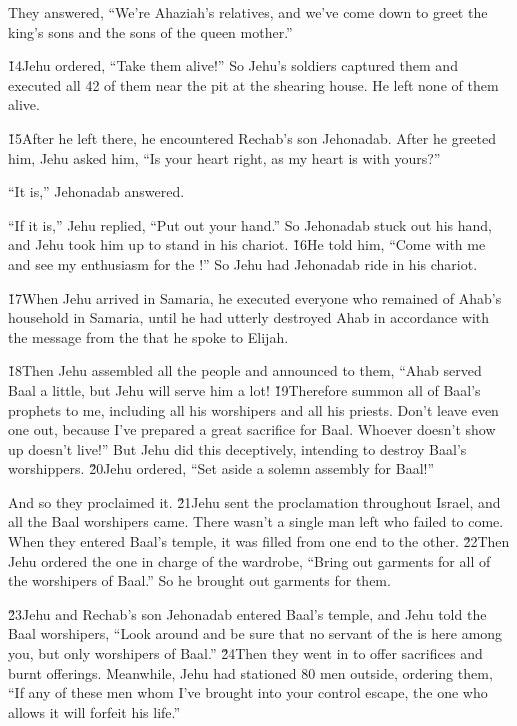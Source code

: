They answered, ``We're Ahaziah's relatives, and we've come down to greet the king's sons and the sons of the queen mother.''

\v{14}Jehu ordered, ``Take them alive!'' So Jehu's soldiers captured them and executed all 42 of them near the pit at the shearing house. He left none of them alive.

\v{15}After he left there, he encountered Rechab's son Jehonadab. After he greeted him, Jehu asked him, ``Is your heart right, as my heart is with yours?''

``It is,'' Jehonadab answered.

``If it is,'' Jehu replied, ``Put out your hand.'' So Jehonadab stuck out his hand, and Jehu took him up to stand in his chariot. \v{16}He told him, ``Come with me and see my enthusiasm for the !'' So Jehu had Jehonadab ride in his chariot.

\v{17}When Jehu arrived in Samaria, he executed everyone who remained of Ahab's household in Samaria, until he had utterly destroyed Ahab in accordance with the message from the  that he spoke to Elijah.

\v{18}Then Jehu assembled all the people and announced to them, ``Ahab served Baal a little, but Jehu will serve him a lot! \v{19}Therefore summon all of Baal's prophets to me, including all his worshipers and all his priests. Don't leave even one out, because I've prepared a great sacrifice for Baal. Whoever doesn't show up doesn't live!'' But Jehu did this deceptively, intending to destroy Baal's worshippers. \v{20}Jehu ordered, ``Set aside a solemn assembly for Baal!''

And so they proclaimed it. \v{21}Jehu sent the proclamation throughout Israel, and all the Baal worshipers came. There wasn't a single man left who failed to come. When they entered Baal's temple, it was filled from one end to the other. \v{22}Then Jehu ordered the one in charge of the wardrobe, ``Bring out garments for all of the worshipers of Baal.'' So he brought out garments for them.

\v{23}Jehu and Rechab's son Jehonadab entered Baal's temple, and Jehu told the Baal worshipers, ``Look around and be sure that no servant of the  is here among you, but only worshipers of Baal.'' \v{24}Then they went in to offer sacrifices and burnt offerings. Meanwhile, Jehu had stationed 80 men outside, ordering them, ``If any of these men whom I've brought into your control escape, the one who allows it will forfeit his life.''

